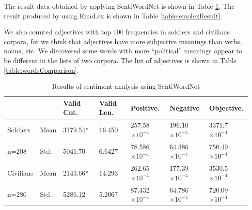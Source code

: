 The result data obtained by applying SentiWordNet is shown in Table \ref{table:sentiResult}.
The result produced by using EmoLex is shown in Table \ref{table:emolexResult}.

We also counted adjectives with top 100 frequencies in soldiers and civilians corpora, for we think that adjectives have more subjective meanings than verbs, nouns, etc. We discovered some words with more \enquote{political} meanings appear to be different in the lists of two corpora. The list of adjectives is shown in Table \ref{table:wordsComparison}.


\begin{table}[h]
  \caption{Results of sentiment analysis using SentiWordNet}
  \label{table:sentiResult}
  \centering
  \renewcommand{\tabularxcolumn}{m} %
  \begin{tabularx}{\textwidth}{l l | l l l l l}
    \toprule
              &      & \textbf{Valid Cnt.} & \textbf{Valid Len.} & \textbf{Positive.}     & \textbf{Negative}      & \textbf{Objective.}
    \tabularnewline \midrule
    Soldiers  & Mean & 3179.54*            & 16.450              & 257.58$\times 10^{-4}$ & 196.10$\times 10^{-4}$ & 3371.7$\times 10^{-4}$
    \tabularnewline
    n=208     & Std. & 5041.70             & 6.6427              & 78.586$\times 10^{-4}$ & 64.386$\times 10^{-4}$ & 750.49$\times 10^{-4}$
    \tabularnewline \hline \hline
    Civilians & Mean & 2143.66*            & 14.293              & 262.65$\times 10^{-4}$ & 177.39$\times 10^{-4}$ & 3530.5$\times 10^{-4}$
    \tabularnewline
    n=280     & Std. & 5286.12             & 5.2067              & 87.432$\times 10^{-4}$ & 64.786$\times 10^{-4}$ & 720.09$\times 10^{-4}$
    \tabularnewline \bottomrule
  \end{tabularx}
\end{table}


